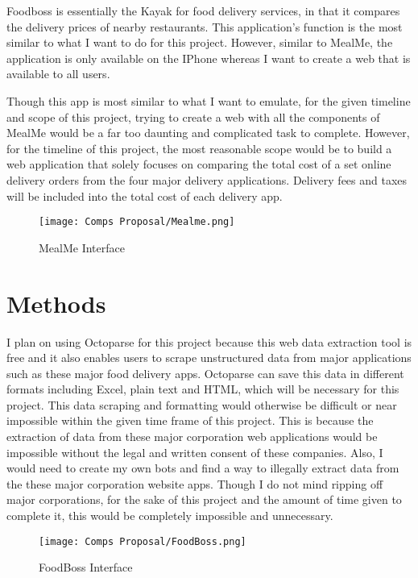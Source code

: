 \documentclass[10pt,twocolumn]{article}
\begin{document}
Foodboss is essentially the Kayak for food delivery services, in that it compares the delivery prices of nearby restaurants. This application's function is the most similar to what I want to do for this project. However, similar to MealMe, the application is only available on the IPhone whereas I want to create a web that is available to all users.

Though this app is most similar to what I want to emulate, for the given timeline and scope of this project, trying to create a web with all the components of MealMe would be a far too daunting and complicated task to complete.  However, for the timeline of this project, the most reasonable scope would be to build a web application that solely focuses on comparing the total cost of a set online delivery orders from the four major delivery applications. Delivery fees and taxes will be included into the total cost of each delivery app.

\begin{figure}
    \centering
    \texttt{[image: Comps Proposal/Mealme.png]}
    \caption{
        MealMe Interface
    }
    \label{fig:second-page-2}
\end{figure}

\section{Methods}

I plan on using Octoparse for this project because this web data extraction tool is free and it also enables users to scrape unstructured data from major applications such as these major food delivery apps. Octoparse can save this data in different formats including Excel, plain text and HTML, which will be necessary for this project. This data scraping and formatting would otherwise be difficult or near impossible within the given time frame of this project. This is because the extraction of data from these major corporation web applications would be impossible without the legal and written consent of these companies. Also, I would need to create my own bots and find a way to illegally extract data from the these major corporation website apps. Though I do not mind ripping off major corporations, for the sake of this project and the amount of time given to complete it, this would be completely impossible and unnecessary.

\begin{figure}
    \centering
    \texttt{[image: Comps Proposal/FoodBoss.png]}
    \caption{
        FoodBoss Interface
    }
    \label{fig:second-page-3}
\end{figure}
\end{document}
